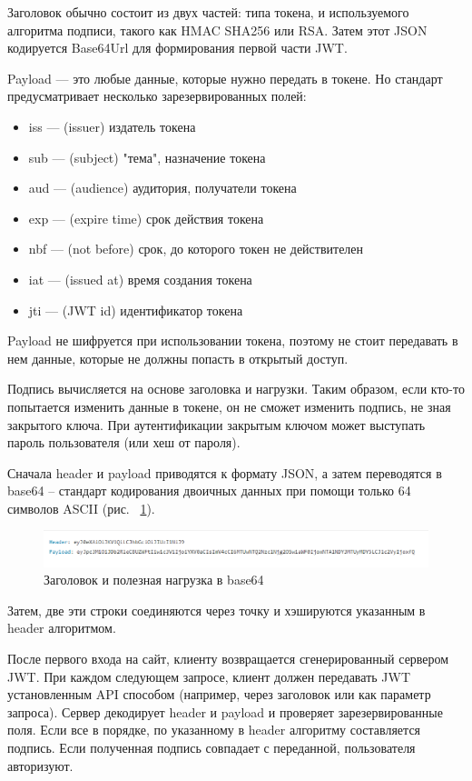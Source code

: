 \documentclass[14pt, a4paper]{diplom}
\begin{document}
Заголовок обычно состоит из двух частей: типа токена, и используемого алгоритма подписи, такого как HMAC SHA256 или RSA.
Затем этот JSON кодируется Base64Url для формирования первой части JWT.

Payload — это любые данные, которые нужно передать в токене. Но стандарт предусматривает несколько зарезервированных полей:

\begin{itemize}
  \item iss — (issuer) издатель токена
  \item sub — (subject) "тема", назначение токена
  \item aud — (audience) аудитория, получатели токена
  \item exp — (expire time) срок действия токена
  \item nbf — (not before) срок, до которого токен не действителен
  \item iat — (issued at) время создания токена
  \item jti — (JWT id) идентификатор токена
\end{itemize}

Payload не шифруется при использовании токена, поэтому не стоит передавать в нем данные, которые не должны попасть в открытый доступ.

Подпись вычисляется на основе заголовка и нагрузки. Таким образом, если кто-то попытается изменить данные в токене, он не сможет изменить подпись, не зная закрытого ключа. При аутентификации закрытым ключом может выступать пароль пользователя (или хеш от пароля).

Сначала header и payload приводятся к формату JSON, а затем переводятся в base64 -- стандарт кодирования двоичных данных при помощи только 64 символов ASCII (рис. ~\ref{c}).

\begin{figure}[!ht]
\centering
\includegraphics[width=1\textwidth]{resources/token.png}
\caption{Заголовок и полезная нагрузка в base64}
\label{c}
\end{figure}

Затем, две эти строки соединяются через точку и хэшируются указанным в header алгоритмом.

После первого входа на сайт, клиенту возвращается сгенерированный сервером JWT. При каждом следующем запросе, клиент должен передавать JWT установленным API способом (например, через заголовок или как параметр запроса). Сервер декодирует header и payload и проверяет зарезервированные поля. Если все в порядке, по указанному в header алгоритму составляется подпись. Если полученная подпись совпадает с переданной, пользователя авторизуют. 
\end{document}
